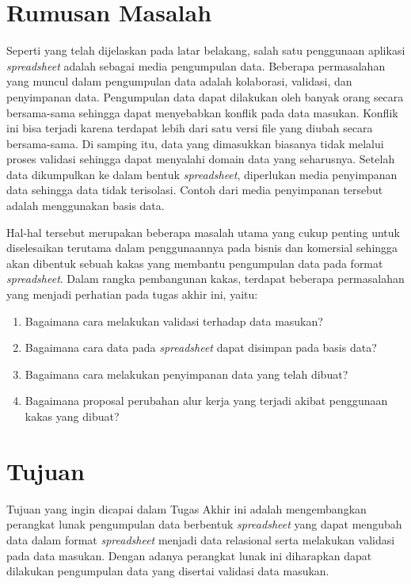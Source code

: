 \section{Rumusan Masalah}\label{RumusanMasalah}

Seperti yang telah dijelaskan pada latar belakang, salah satu penggunaan aplikasi \textit{spreadsheet} adalah sebagai media pengumpulan data. Beberapa permasalahan yang muncul dalam pengumpulan data adalah kolaborasi, validasi, dan penyimpanan data. Pengumpulan data dapat dilakukan oleh banyak orang secara bersama-sama sehingga dapat menyebabkan konflik pada data masukan. Konflik ini bisa terjadi karena terdapat lebih dari satu versi file yang diubah secara bersama-sama. Di samping itu, data yang dimasukkan biasanya tidak melalui proses validasi sehingga dapat menyalahi domain data yang seharusnya. Setelah data dikumpulkan ke dalam bentuk \textit{spreadsheet}, diperlukan media penyimpanan data sehingga data tidak terisolasi. Contoh dari media penyimpanan tersebut adalah menggunakan basis data.

Hal-hal tersebut merupakan beberapa masalah utama yang cukup penting untuk diselesaikan terutama dalam penggunaannya pada bisnis dan komersial sehingga akan dibentuk sebuah kakas yang membantu pengumpulan data pada format \textit{spreadsheet}. Dalam rangka pembangunan kakas, terdapat beberapa permasalahan yang menjadi perhatian pada tugas akhir ini, yaitu:

\begin{enumerate}
    \item Bagaimana cara melakukan validasi terhadap data masukan?
    \item Bagaimana cara data pada \textit{spreadsheet} dapat disimpan pada basis data?
    \item Bagaimana cara melakukan penyimpanan data yang telah dibuat?
    \item Bagaimana proposal perubahan alur kerja yang terjadi akibat penggunaan kakas yang dibuat?
\end{enumerate}

\section{Tujuan}

Tujuan yang ingin dicapai dalam Tugas Akhir ini adalah mengembangkan perangkat lunak pengumpulan data berbentuk \textit{spreadsheet} yang dapat mengubah data dalam format \textit{spreadsheet} menjadi data relasional serta melakukan validasi pada data masukan. Dengan adanya perangkat lunak ini diharapkan dapat dilakukan pengumpulan data yang disertai validasi data masukan.

